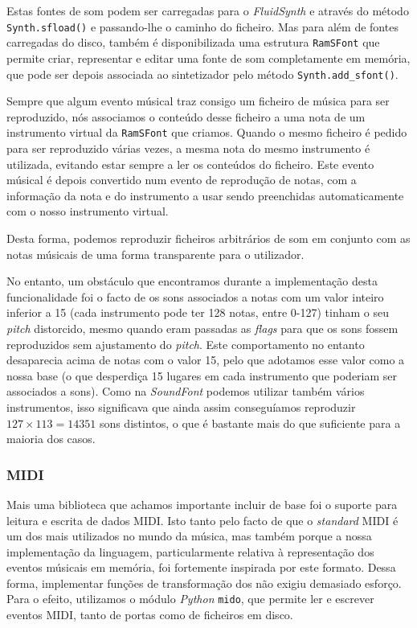 Estas fontes de som podem ser carregadas para o \textit{FluidSynth} e através do método \texttt{Synth.sfload()} e passando-lhe o caminho do ficheiro. Mas para além de fontes carregadas do disco, também é disponibilizada uma estrutura \texttt{RamSFont} que permite criar, representar e editar uma fonte de som completamente em memória, que pode ser depois associada ao sintetizador pelo método \texttt{Synth.add\_sfont()}.

Sempre que algum evento músical traz consigo um ficheiro de música para ser reproduzido, nós associamos o conteúdo desse ficheiro a uma nota de um instrumento virtual da \texttt{RamSFont} que criamos. Quando o mesmo ficheiro é pedido para ser reproduzido várias vezes, a mesma nota do mesmo instrumento é utilizada, evitando estar sempre a ler os conteúdos do ficheiro. Este evento músical é depois convertido num evento de reprodução de notas, com a informação da nota e do instrumento a usar sendo preenchidas automaticamente com o nosso instrumento virtual.

Desta forma, podemos reproduzir ficheiros arbitrários de som em conjunto com as notas músicais de uma forma transparente para o utilizador.

No entanto, um obstáculo que encontramos durante a implementação desta funcionalidade foi o facto de os sons associados a notas com um valor inteiro inferior a 15 (cada instrumento pode ter 128 notas, entre 0-127) tinham o seu \textit{pitch} distorcido, mesmo quando eram passadas as \textit{flags} para que os sons fossem reproduzidos sem ajustamento do \textit{pitch}. Este comportamento no entanto desaparecia acima de notas com o valor 15, pelo que adotamos esse valor como a nossa base (o que desperdiça 15 lugares em cada instrumento que poderiam ser associados a sons). Como na \textit{SoundFont} podemos utilizar também vários instrumentos, isso significava que ainda assim conseguíamos reproduzir $127 \times 113 = 14351$ sons distintos, o que é bastante mais do que suficiente para a maioria dos casos.

\subsubsection{MIDI}
Mais uma biblioteca que achamos importante incluir de base foi o suporte para leitura e escrita de dados MIDI. Isto tanto pelo facto de que o \textit{standard} MIDI é um dos mais utilizados no mundo da música, mas também porque a nossa implementação da linguagem, particularmente relativa à representação dos eventos músicais em memória, foi fortemente inspirada por este formato. Dessa forma, implementar funções de transformação dos não exigiu demasiado esforço. Para o efeito, utilizamos o módulo \textit{Python} \texttt{mido}, que permite ler e escrever eventos MIDI, tanto de portas como de ficheiros em disco.

